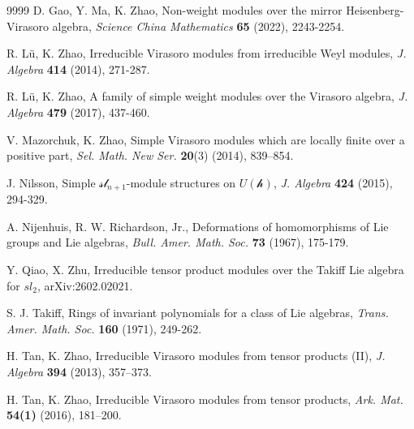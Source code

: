 \documentclass[12pt,reqno]{amsart}
\numberwithin{equation}{section}
\begin{document}
\begin{thebibliography}{9999}
D. Gao, Y. Ma, K. Zhao, Non-weight modules over the mirror Heisenberg-Virasoro algebra, {\it Science China
Mathematics} {\bf 65} (2022), 2243-2254.
 
 
 



 













 





 R. L\"{u}, K. Zhao, Irreducible  Virasoro modules from irreducible Weyl modules, {\it J. Algebra}  {\bf 414} (2014), 271-287.

 R. L\"{u}, K. Zhao,  A family of simple weight modules over the Virasoro algebra, {\it J. Algebra} {\bf 479} (2017), 437-460.

V. Mazorchuk, K. Zhao, Simple Virasoro modules which are locally finite over a positive part, \textit{Sel. Math. New Ser.} \textbf{20}(3)  (2014), 839--854.

 J. Nilsson, Simple $\mathcal{sl}_{n+1}$-module structures on $U(\mathcal{h})$, {\it J. Algebra} {\bf 424} (2015), 294-329.

A. Nijenhuis, R. W. Richardson, Jr.,
Deformations of homomorphisms of Lie groups and Lie algebras,
{\it Bull. Amer. Math. Soc.} {\bf 73} (1967), 175-179.


 Y. Qiao, X. Zhu, Irreducible tensor product modules over the Takiff Lie algebra for $sl_2$, arXiv:2602.02021.

 
S. J. Takiff, Rings of invariant polynomials for a class of Lie algebras, {\it Trans. Amer. Math. Soc.} {\bf 160} (1971), 249-262.


H. Tan, K. Zhao, Irreducible Virasoro modules from tensor products (II), \textit{J. Algebra} \textbf{394} (2013), 357--373.

 H. Tan, K. Zhao, Irreducible Virasoro modules from tensor products, \textit{Ark. Mat.} \textbf{54(1)} (2016), 181--200.


\end{thebibliography}
\end{document}
